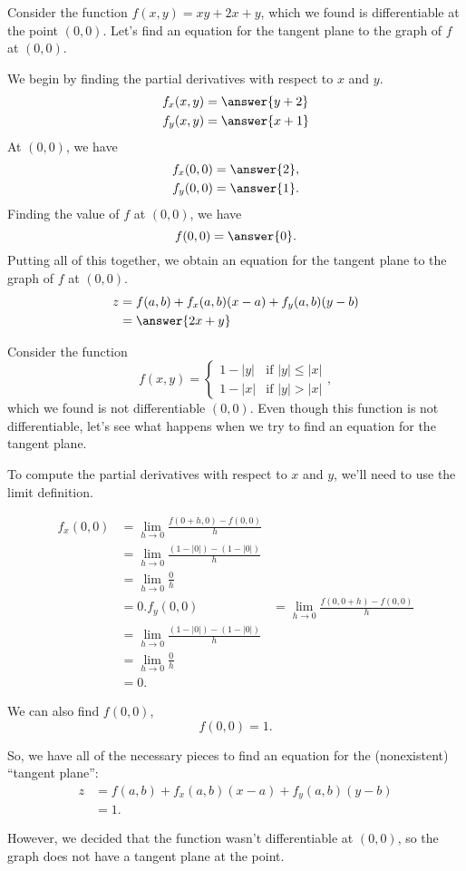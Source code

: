\documentclass{ximera}
\begin{document}
\begin{example}
Consider the function $f(x,y) = xy+2x+y$, which we found is differentiable at the point $(0,0)$. Let's find an equation for the tangent plane to the graph of $f$ at $(0,0)$.

We begin by finding the partial derivatives with respect to $x$ and $y$.
\begin{align*}
f_x(x,y) &= \answer{y+2}\\
f_y(x,y) &= \answer{x+1}
\end{align*} 
At $(0,0)$, we have
\begin{align*}
f_x(0,0) &= \answer{2},\\
f_y(0,0) &= \answer{1}.
\end{align*} 
Finding the value of $f$ at $(0,0)$, we have
\[
f(0,0) = \answer{0}.
\]
Putting all of this together, we obtain an equation for the tangent plane to the graph of $f$ at $(0,0)$.
\begin{align*}
z &=f(a,b)+f_x(a,b)(x-a)+f_y(a,b)(y-b)\\
&= \answer{2x+y}
\end{align*}

\end{example}

\begin{example}
Consider the function 
\[
f(x,y) = \begin{cases} 
      1-|y| & \text{if }|y|\leq |x| \\
      1-|x| & \text{if }|y| > |x|
   \end{cases},
\] which we found is not differentiable $(0,0)$. Even though this function is not differentiable, let's see what happens when we try to find an equation for the tangent plane.

To compute the partial derivatives with respect to $x$ and $y$, we'll need to use the limit definition.

\begin{align*}
f_x(0,0) &= \lim_{h\rightarrow 0}\frac{f(0+h,0)-f(0,0)}{h}\\
&= \lim_{h\rightarrow 0}\frac{(1-|0|)-(1-|0|)}{h}\\
&= \lim_{h\rightarrow 0}\frac{0}{h}\\
&= 0.
f_y(0,0) &= \lim_{h\rightarrow 0}\frac{f(0,0+h)-f(0,0)}{h}\\
&= \lim_{h\rightarrow 0}\frac{(1-|0|)-(1-|0|)}{h}\\
&= \lim_{h\rightarrow 0}\frac{0}{h}\\
&= 0.
\end{align*}

We can also find $f(0,0)$,
\[
f(0,0)= 1.
\]

So, we have all of the necessary pieces to find an equation for the (nonexistent) ``tangent plane'':
\begin{align*}
z &=f(a,b)+f_x(a,b)(x-a)+f_y(a,b)(y-b)\\
&= 1.
\end{align*}

However, we decided that the function wasn't differentiable at $(0,0)$, so the graph does not have a tangent plane at the point.

\end{example}
\end{document}
